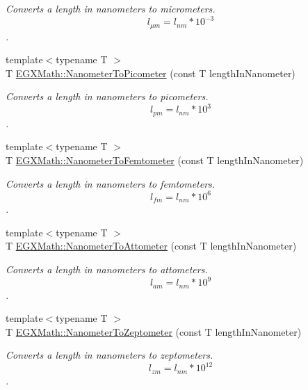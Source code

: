 \begin{DoxyCompactItemize}
\begin{DoxyCompactList}\small\item\em Converts a length in nanometers to micrometers. \[ l_{\mu m}=l_{nm} * 10^{-3} \]. \end{DoxyCompactList}\item 
{\footnotesize template$<$typename T $>$ }\\T \mbox{\hyperlink{group___e_g_x_math-_conversions-_length_conversions-_s_i-_nanometer-_s_i_gaba1e9bf91f6e065f8ba8be8dd039b499}{E\+G\+X\+Math\+::\+Nanometer\+To\+Picometer}} (const T length\+In\+Nanometer)
\begin{DoxyCompactList}\small\item\em Converts a length in nanometers to picometers. \[ l_{pm}=l_{nm} * 10^{3} \]. \end{DoxyCompactList}\item 
{\footnotesize template$<$typename T $>$ }\\T \mbox{\hyperlink{group___e_g_x_math-_conversions-_length_conversions-_s_i-_nanometer-_s_i_ga35ac002514f0d8cda8b1fe100b21f54b}{E\+G\+X\+Math\+::\+Nanometer\+To\+Femtometer}} (const T length\+In\+Nanometer)
\begin{DoxyCompactList}\small\item\em Converts a length in nanometers to femtometers. \[ l_{fm}=l_{nm} * 10^{6} \]. \end{DoxyCompactList}\item 
{\footnotesize template$<$typename T $>$ }\\T \mbox{\hyperlink{group___e_g_x_math-_conversions-_length_conversions-_s_i-_nanometer-_s_i_ga6bb90e8a7f98c79dc2ebbb8a46535fe0}{E\+G\+X\+Math\+::\+Nanometer\+To\+Attometer}} (const T length\+In\+Nanometer)
\begin{DoxyCompactList}\small\item\em Converts a length in nanometers to attometers. \[ l_{am}=l_{nm} * 10^{9} \]. \end{DoxyCompactList}\item 
{\footnotesize template$<$typename T $>$ }\\T \mbox{\hyperlink{group___e_g_x_math-_conversions-_length_conversions-_s_i-_nanometer-_s_i_ga3104d856008f94fc14378e95cfbe771f}{E\+G\+X\+Math\+::\+Nanometer\+To\+Zeptometer}} (const T length\+In\+Nanometer)
\begin{DoxyCompactList}\small\item\em Converts a length in nanometers to zeptometers. \[ l_{zm}=l_{nm} * 10^{12} \]. \end{DoxyCompactList}\item 

\end{DoxyCompactItemize}
